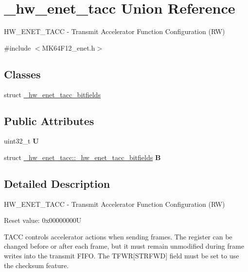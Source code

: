 \hypertarget{union__hw__enet__tacc}{}\section{\+\_\+hw\+\_\+enet\+\_\+tacc Union Reference}
\label{union__hw__enet__tacc}


H\+W\+\_\+\+E\+N\+E\+T\+\_\+\+T\+A\+CC -\/ Transmit Accelerator Function Configuration (RW)  




{\ttfamily \#include $<$M\+K64\+F12\+\_\+enet.\+h$>$}

\subsection*{Classes}
\begin{DoxyCompactItemize}
\item 
struct \hyperlink{struct__hw__enet__tacc_1_1__hw__enet__tacc__bitfields}{\+\_\+hw\+\_\+enet\+\_\+tacc\+\_\+bitfields}
\end{DoxyCompactItemize}
\subsection*{Public Attributes}
\begin{DoxyCompactItemize}
\item 
uint32\+\_\+t {\bfseries U}\hypertarget{union__hw__enet__tacc_a2f8267a896594a5e783c19b85061421f}{}\label{union__hw__enet__tacc_a2f8267a896594a5e783c19b85061421f}

\item 
struct \hyperlink{struct__hw__enet__tacc_1_1__hw__enet__tacc__bitfields}{\+\_\+hw\+\_\+enet\+\_\+tacc\+::\+\_\+hw\+\_\+enet\+\_\+tacc\+\_\+bitfields} {\bfseries B}\hypertarget{union__hw__enet__tacc_a846d84aee5a0dbbd30421faf21dad03b}{}\label{union__hw__enet__tacc_a846d84aee5a0dbbd30421faf21dad03b}

\end{DoxyCompactItemize}


\subsection{Detailed Description}
H\+W\+\_\+\+E\+N\+E\+T\+\_\+\+T\+A\+CC -\/ Transmit Accelerator Function Configuration (RW) 

Reset value\+: 0x00000000U

T\+A\+CC controls accelerator actions when sending frames. The register can be changed before or after each frame, but it must remain unmodified during frame writes into the transmit F\+I\+FO. The T\+F\+WR\mbox{[}S\+T\+R\+F\+WD\mbox{]} field must be set to use the checksum feature. 

